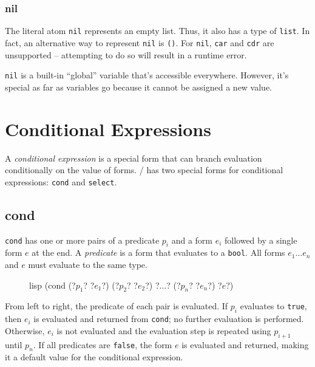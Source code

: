 \documentclass[a4paper, 12pt]{article}
\begin{document}
\subsubsection{nil}
The literal atom \texttt{nil} represents an empty list. Thus, it also has a type of \texttt{list}. In fact, an alternative way to represent \texttt{nil} is \texttt{()}. For \texttt{nil}, \texttt{car} and \texttt{cdr} are unsupported -- attempting to do so will result in a runtime error.

\texttt{nil} is a built-in ``global'' variable that's accessible everywhere. However, it's special as far as variables go because it cannot be assigned a new value.

\section{Conditional Expressions}
A \textit{conditional expression} is a special form that can branch evaluation conditionally on the value of forms. \lispy/ has two special forms for conditional expressions: \texttt{cond} and \texttt{select}.

\subsection{cond}

\texttt{cond} has one or more pairs of a predicate $p_i$ and a form $e_i$ followed by a single form $e$ at the end. A \textit{predicate} is a form that evaluates to a \texttt{bool}. All forms $e_1 \ldots e_n$ and $e$ must evaluate to the same type.

\begin{figure}[htp]
    \centering
    \begin{cminted}[autogobble=true, escapeinside=??]{lisp}
        (cond (?$p_1$? ?$e_1$?) (?$p_2$? ?$e_2$?) ?$\ldots$? (?$p_n$? ?$e_n$?) ?$e$?)
    \end{cminted}
    \captionsetup[figure]{font=small}
\end{figure}

From left to right, the predicate of each pair is evaluated. If $p_i$ evaluates to \texttt{true}, then $e_i$ is evaluated and returned from \texttt{cond}; no further evaluation is performed. Otherwise, $e_i$ is not evaluated and the evaluation step is repeated using $p_{i + 1}$ until $p_n$. If all predicates are \texttt{false}, the form $e$ is evaluated and returned, making it a default value for the conditional expression.
\end{document}
